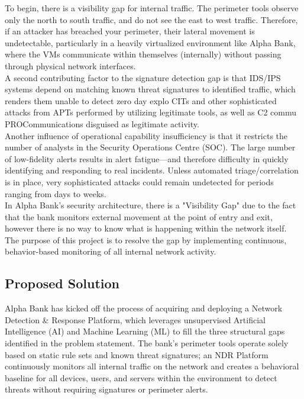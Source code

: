 \documentclass[12pt,a4paper]{report}
\begin{document}
To begin, there is a visibility gap for internal traffic. The perimeter tools observe only the north to south traffic, and do not see the east to west traffic. Therefore, if an attacker has breached your perimeter, their lateral movement is undetectable, particularly in a heavily virtualized environment like Alpha Bank, where the VMs communicate within themselves (internally) without passing through physical network interfaces.\\

A second contributing factor to the signature detection gap is that IDS/IPS systems depend on matching known threat signatures to identified traffic, which renders them unable to detect zero day explo CITs and other sophisticated attacks from APTs performed by utilizing legitimate tools, as well as C2 commu PROCommunications disguised as legitimate activity.\\

Another influence of operational capability insufficiency is that it restricts the number of analysts in the Security Operations Centre (SOC). The large number of low-fidelity alerts results in alert fatigue—and therefore difficulty in quickly identifying and responding to real incidents. Unless automated triage/correlation is in place, very sophisticated attacks could remain undetected for periods ranging from days to weeks.\\

In Alpha Bank's security architecture, there is a "Visibility Gap" due to the fact that the bank monitors external movement at the point of entry and exit, however there is no way to know what is happening within the network itself. The purpose of this project is to resolve the gap by implementing continuous, behavior-based monitoring of all internal network activity.


\subsection{Proposed Solution}

Alpha Bank has kicked off the process of acquiring and deploying a Network Detection \& Response Platform, which leverages unsupervised Artificial Intelligence (AI) and Machine Learning (ML) to fill the three structural gaps identified in the problem statement. The bank's perimeter tools operate solely based on static rule sets and known threat signatures; an NDR Platform continuously monitors all internal traffic on the network and creates a behavioral baseline for all devices, users, and servers within the environment to detect threats without requiring signatures or perimeter alerts.\\
\end{document}
